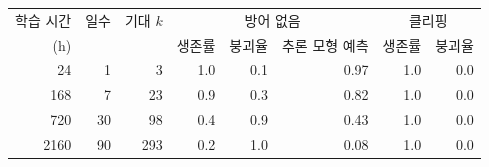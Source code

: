 \begin{tabular}{rrr|rrr|rr}
\toprule
학습 시간 & 일수 & 기대 $k$ & \multicolumn{3}{c|}{방어 없음} & \multicolumn{2}{c}{클리핑} \\
(h) & & & 생존률 & 붕괴율 & 추론 모형 예측 & 생존률 & 붕괴율 \\
\midrule
24 & 1 & 3 & 1.0 & 0.1 & 0.97 & 1.0 & 0.0 \\
168 & 7 & 23 & 0.9 & 0.3 & 0.82 & 1.0 & 0.0 \\
720 & 30 & 98 & 0.4 & 0.9 & 0.43 & 1.0 & 0.0 \\
2160 & 90 & 293 & 0.2 & 1.0 & 0.08 & 1.0 & 0.0 \\
\bottomrule
\end{tabular}
